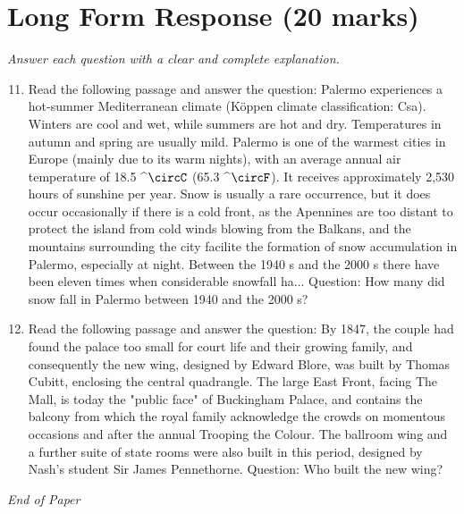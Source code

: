 \documentclass[12pt]{article}
\begin{document}
\section*{Long Form Response (20 marks)}
\textit{Answer each question with a clear and complete explanation.}
\begin{enumerate}[label=\arabic*.]
\setcounter{enumi}{10}
\item Read the following passage and answer the question: Palermo experiences a hot-summer Mediterranean climate (Köppen climate classification: Csa). Winters are cool and wet, while summers are hot and dry. Temperatures in autumn and spring are usually mild. Palermo is one of the warmest cities in Europe (mainly due to its warm nights), with an average annual air temperature of 18.5 ^\ensuremath{\circC} (65.3 ^\ensuremath{\circF}). It receives approximately 2,530 hours of sunshine per year. Snow is usually a rare occurrence, but it does occur occasionally if there is a cold front, as the Apennines are too distant to protect the island from cold winds blowing from the Balkans, and the mountains surrounding the city facilite the formation of snow accumulation in Palermo, especially at night. Between the 1940 s and the 2000 s there have been eleven times when considerable snowfall ha... Question: How many did snow fall in Palermo between 1940 and the 2000 s?
\item Read the following passage and answer the question: By 1847, the couple had found the palace too small for court life and their growing family, and consequently the new wing, designed by Edward Blore, was built by Thomas Cubitt, enclosing the central quadrangle. The large East Front, facing The Mall, is today the "public face" of Buckingham Palace, and contains the balcony from which the royal family acknowledge the crowds on momentous occasions and after the annual Trooping the Colour. The ballroom wing and a further suite of state rooms were also built in this period, designed by Nash's student Sir James Pennethorne. Question: Who built the new wing?
\end{enumerate}

\vfill
\noindent\textit{End of Paper}
\end{document}
